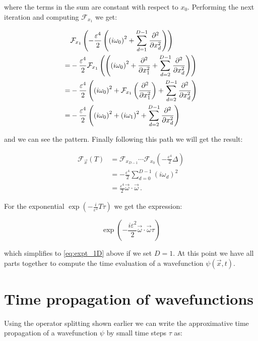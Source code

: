 where the terms in the sum are constant with respect to $x_0$. Performing the next
iteration and computing $\mathcal{F}_{x_1}$ we get:

\begin{align*}
    & \mathcal{F}_{x_1}\left(-\frac{\varepsilon^4}{2} \left(\left(i\omega_0\right)^2 + \sum_{d=1}^{D-1} \pdiff[2]{}{x_d}\right)\right) \\
  = & -\frac{\varepsilon^4}{2} \mathcal{F}_{x_1}\left(\left(\left(i\omega_0\right)^2 + \pdiff[2]{}{x_1} + \sum_{d=2}^{D-1} \pdiff[2]{}{x_d}\right)\right) \\
  = & -\frac{\varepsilon^4}{2} \left(\left(i\omega_0\right)^2 + \mathcal{F}_{x_1}\left(\pdiff[2]{}{x_1}\right) + \sum_{d=2}^{D-1} \pdiff[2]{}{x_d}\right) \\
  = & -\frac{\varepsilon^4}{2} \left(\left(i\omega_0\right)^2 + \left(i\omega_1\right)^2 + \sum_{d=2}^{D-1} \pdiff[2]{}{x_d}\right)
\end{align*}

and we can see the pattern. Finally following this path we will get the result:

\begin{align*}
  \mathcal{F}_{\vec{x}}\left(T\right)
  & = \mathcal{F}_{x_{D-1}}\cdots\mathcal{F}_{x_0}\left(-\frac{\varepsilon^4}{2} \Delta\right) \\
  & = -\frac{\varepsilon^4}{2} \sum_{d=0}^{D-1} \left(i\omega_d\right)^2 \\
  & = \frac{\varepsilon^4}{2} \vec{\omega} \cdot \vec{\omega} \,.
\end{align*}

For the exponential $\exp\left(-\frac{i}{\varepsilon^2}T\tau\right)$ we get
the expression:

\begin{equation}
  \exp\left(-\frac{i\varepsilon^2}{2} \vec{\omega} \cdot \vec{\omega} \tau\right)
\end{equation}

which simplifies to \eqref{eq:expt_1D} above if we set $D=1$. At this point we
have all parts together to compute the time evaluation of a wavefunction $\psi(\vec{x}, t)$.


\section{Time propagation of wavefunctions}


Using the operator splitting shown earlier we can write the approximative time
propagation of a wavefunction $\psi$ by small time steps $\tau$ as:

